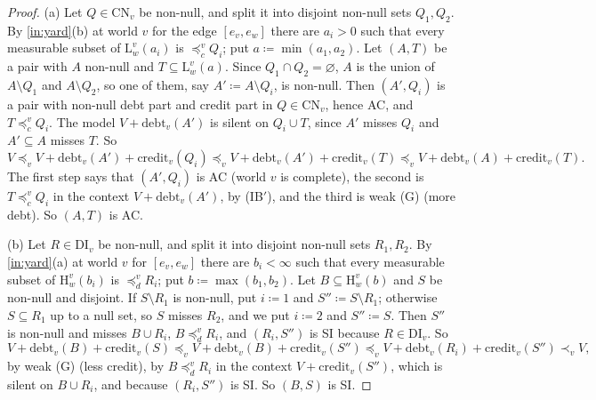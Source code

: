 \documentclass[11pt]{article}
\theoremstyle{definition}\newtheorem{definition}[theorem]{Definition}
\theoremstyle{remark}\newtheorem{remark}[theorem]{Remark}
\newcommand{\debt}{\mathrm{debt}}
\newcommand{\cred}{\mathrm{credit}}
\newcommand{\Lo}[3]{\mathrm L^{#1}_{#2}(#3)}
\newcommand{\Hi}[3]{\mathrm H^{#1}_{#2}(#3)}
\newcommand{\CN}{\mathrm{CN}}
\newcommand{\DI}{\mathrm{DI}}
\begin{document}
\begin{proof}
(a) Let $Q\in\CN_v$ be non-null, and split it into disjoint non-null sets
$Q_1,Q_2$. By \ref{in:yard}(b) at world $v$ for the edge $[e_v,e_w]$ there
are $a_i>0$ such that every measurable subset of $\Lo vw{a_i}$ is
$\preceq^v_cQ_i$; put $a\coloneqq\min(a_1,a_2)$. Let $(A,T)$ be a pair with
$A$ non-null and $T\subseteq\Lo vwa$. Since $Q_1\cap Q_2=\varnothing$, $A$
is the union of $A\setminus Q_1$ and $A\setminus Q_2$, so one of them, say
$A'\coloneqq A\setminus Q_i$, is non-null. Then $(A',Q_i)$ is a pair with
non-null debt part and credit part in $Q\in\CN_v$, hence AC, and
$T\preceq^v_cQ_i$. The model $V+\debt_v(A')$ is silent on $Q_i\cup T$, since
$A'$ misses $Q_i$ and $A'\subseteq A$ misses $T$. So
\[
 V\preceq_vV+\debt_v(A')+\cred_v(Q_i)\preceq_vV+\debt_v(A')+\cred_v(T)
 \preceq_vV+\debt_v(A)+\cred_v(T).
\]
The first step says that $(A',Q_i)$ is AC (world $v$ is complete), the
second is $T\preceq^v_cQ_i$ in the context $V+\debt_v(A')$, by (IB$'$), and
the third is weak (G) (more debt). So $(A,T)$ is AC.

(b) Let $R\in\DI_v$ be non-null, and split it into disjoint non-null sets
$R_1,R_2$. By \ref{in:yard}(a) at world $v$ for $[e_v,e_w]$ there are
$b_i<\infty$ such that every measurable subset of $\Hi vw{b_i}$ is
$\preceq^v_dR_i$; put $b\coloneqq\max(b_1,b_2)$. Let $B\subseteq\Hi vwb$
and $S$ be non-null and disjoint. If $S\setminus R_1$ is non-null, put
$i\coloneqq1$ and $S''\coloneqq S\setminus R_1$; otherwise $S\subseteq R_1$
up to a null set, so $S$ misses $R_2$, and we put $i\coloneqq2$ and
$S''\coloneqq S$. Then $S''$ is non-null and misses $B\cup R_i$,
$B\preceq^v_dR_i$, and $(R_i,S'')$ is SI because $R\in\DI_v$. So
\[
 V+\debt_v(B)+\cred_v(S)\preceq_vV+\debt_v(B)+\cred_v(S'')\preceq_v
 V+\debt_v(R_i)+\cred_v(S'')\prec_vV,
\]
by weak (G) (less credit), by $B\preceq^v_dR_i$ in the context
$V+\cred_v(S'')$, which is silent on $B\cup R_i$, and because $(R_i,S'')$
is SI. So $(B,S)$ is SI.
\end{proof}
\end{document}
